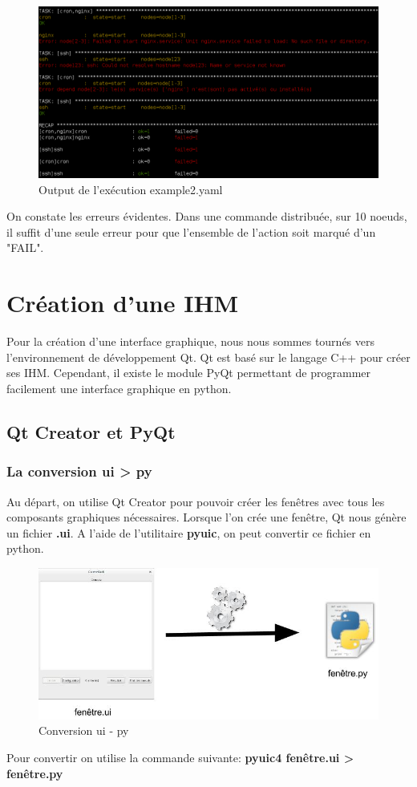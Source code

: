 \documentclass[a4paper,11pt]{article}
\begin{document}
\begin{figure}[H]
		\centerline{\includegraphics[scale=0.4]{resultat2_yaml.png}}
		\caption{Output de l'exécution example2.yaml}
\end{figure}
\noindent
On constate les erreurs évidentes. Dans une commande distribuée, sur 10 noeuds, il suffit d'une seule erreur pour que l'ensemble de l'action soit marqué d'un "FAIL".

\pagebreak

\section{Création d'une IHM}
\label{sec:section5}
Pour la création d'une interface graphique, nous nous sommes tournés vers l'environnement de développement Qt. Qt est basé sur le langage C++ pour créer ses IHM. Cependant, il existe le module PyQt permettant de programmer facilement une interface graphique en python.
\subsection{Qt Creator et PyQt}
\subsubsection{La conversion ui > py}
Au départ, on utilise Qt Creator pour pouvoir créer les fenêtres avec tous les composants graphiques nécessaires. Lorsque l'on crée une fenêtre, Qt nous génère un fichier \textbf{.ui}. A l'aide de l'utilitaire \textbf{pyuic}, on peut convertir ce fichier en python.
\smallbreak
\begin{figure}[hbtp]
\centering
\includegraphics[scale=0.3]{conversion_ui_py.jpg}
\caption{Conversion ui - py}
\end{figure}
Pour convertir on utilise la commande suivante: \textbf{pyuic4 fenêtre.ui > fenêtre.py}
\end{document}
